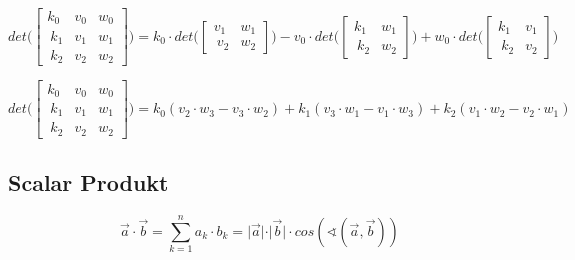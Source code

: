 \documentclass[12pt]{article}
\begin{document}
\begin{equation} 
det \Bigg( \begin{bmatrix}
k_0 & v_0 & w_0 \\\
k_1 & v_1 & w_1 \\\
k_2 & v_2 & w_2
\end{bmatrix} \Bigg) = k_0 \cdot 	det \bigg( \begin{bmatrix}
v_1 & w_1\\\
v_2 & w_2 
\end{bmatrix} \bigg) - v_0 \cdot 	det \bigg( \begin{bmatrix}
k_1 & w_1\\\
k_2 & w_2 
\end{bmatrix} \bigg) + w_0 \cdot 	det \bigg( \begin{bmatrix}
k_1 & v_1\\\
k_2 & v_2 
\end{bmatrix} \bigg)
\end{equation}

\begin{equation} 
det \Bigg( \begin{bmatrix}
k_0 & v_0 & w_0 \\\
k_1 & v_1 & w_1 \\\
k_2 & v_2 & w_2
\end{bmatrix} \Bigg) = k_0 ( v_2 \cdot w_3 - v_3 \cdot w_2 ) + 
k_1 ( v_3 \cdot w_1 - v_1 \cdot w_3 )
+ k_2 (v_1 \cdot w_2 - v_2 \cdot w_1)
\end{equation}



\subsection*{ Scalar Produkt }

\begin{equation}
\overrightarrow{a} \cdot \overrightarrow{b} = \sum_{k=1}^n a_k \cdot b_k  = \vert \overrightarrow{a} \vert \cdot \vert \overrightarrow{b} \vert \cdot cos(\sphericalangle (\overrightarrow{a}, \overrightarrow{b} ))
\end{equation}
\end{document}

